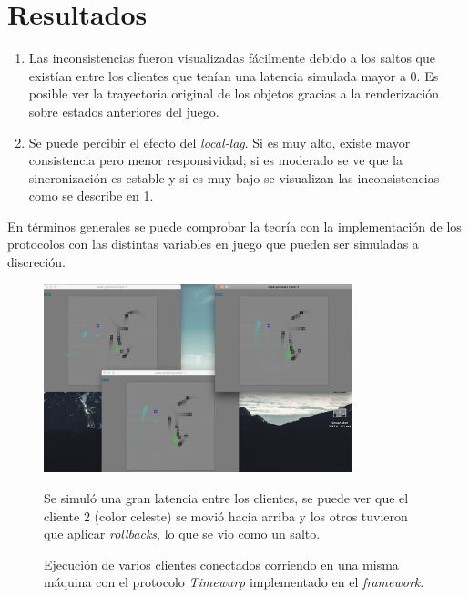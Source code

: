 \section{Resultados}

\begin{enumerate}
	\item Las inconsistencias fueron visualizadas fácilmente debido a los saltos que existían entre los clientes que tenían una latencia simulada mayor a 0. Es posible ver la trayectoria original de los objetos gracias a la renderización sobre estados anteriores del juego.
	\item Se puede percibir el efecto del \emph{local-lag}. Si es muy alto, existe mayor consistencia pero menor responsividad; si es moderado se ve que la sincronización es estable y si es muy bajo se visualizan las inconsistencias como se describe en 1.
\end{enumerate}

En términos generales se puede comprobar la teoría con la implementación de los protocolos con las distintas variables en juego que pueden ser simuladas a discreción.


\begin{figure}[h]
\centering
\includegraphics[width=0.8\textwidth]{run}
\caption{\label{fig:execution} \small Ejecución de varios clientes conectados corriendo en una misma máquina con el protocolo \emph{Timewarp} implementado en el \emph{framework}.} Se simuló una gran latencia entre los clientes, se puede ver que el cliente $2$ (color celeste) se movió hacia arriba y los otros tuvieron que aplicar \emph{rollbacks}, lo que se vio como un salto.
\end{figure}


